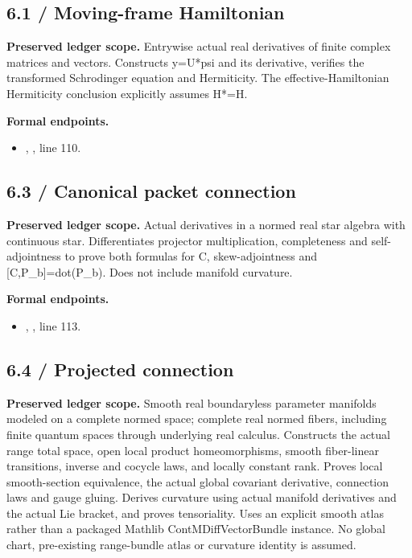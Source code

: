 \subsection{6.1 / Moving-frame Hamiltonian}
\label{result:6.1}
\textbf{Preserved ledger scope.} Entrywise actual real derivatives of finite complex matrices and vectors. Constructs y=U*psi and its derivative, verifies the transformed Schrodinger equation and Hermiticity. The effective-Hamiltonian Hermiticity conclusion explicitly assumes H*=H.

\textbf{Formal endpoints.}\begin{itemize}
\item {}, , line 110.
\end{itemize}
\subsection{6.3 / Canonical packet connection}
\label{result:6.3}
\textbf{Preserved ledger scope.} Actual derivatives in a normed real star algebra with continuous star. Differentiates projector multiplication, completeness and self-adjointness to prove both formulas for C, skew-adjointness and [C,P\_b]=dot(P\_b). Does not include manifold curvature.

\textbf{Formal endpoints.}\begin{itemize}
\item {}, , line 113.
\end{itemize}
\subsection{6.4 / Projected connection}
\label{result:6.4}
\textbf{Preserved ledger scope.} Smooth real boundaryless parameter manifolds modeled on a complete normed space; complete real normed fibers, including finite quantum spaces through underlying real calculus. Constructs the actual range total space, open local product homeomorphisms, smooth fiber-linear transitions, inverse and cocycle laws, and locally constant rank. Proves local smooth-section equivalence, the actual global covariant derivative, connection laws and gauge gluing. Derives curvature using actual manifold derivatives and the actual Lie bracket, and proves tensoriality. Uses an explicit smooth atlas rather than a packaged Mathlib ContMDiffVectorBundle instance. No global chart, pre-existing range-bundle atlas or curvature identity is assumed.

